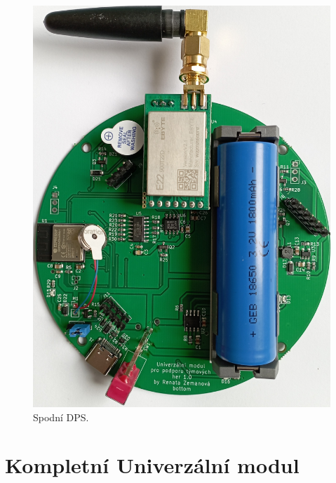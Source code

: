 \begin{figure}[!h]
	\begin{center}
	  \includegraphics[scale=0.22]{obrazky/DPS_final_spodni.jpg}
	\end{center}
	\caption[Spodní DPS]{Spodní DPS.}
\end{figure}

\chapter{Kompletní Univerzální modul}


